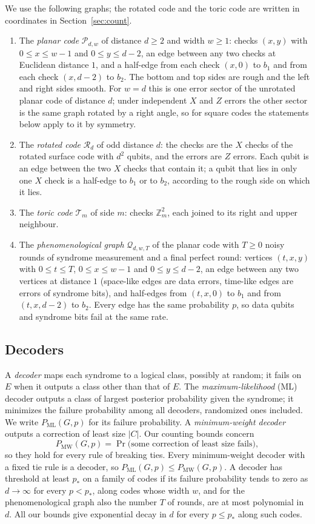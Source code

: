 \documentclass[11pt]{amsart}
\theoremstyle{definition}
\theoremstyle{remark}
\numberwithin{equation}{section}
\newcommand{\PML}{P_{\mathrm{ML}}}
\newcommand{\PMW}{P_{\mathrm{MW}}}
\begin{document}
We use the following graphs; the rotated code and the toric code are written in coordinates in Section~\ref{sec:count}.
\begin{enumerate}[label=(\alph*),leftmargin=2em]
\item The \emph{planar code} $\mathcal P_{d,w}$ of distance $d\ge2$ and width $w\ge1$: checks $(x,y)$ with $0\le x\le w-1$ and $0\le y\le d-2$, an edge between any two checks at Euclidean distance $1$, and a half-edge from each check $(x,0)$ to $b_1$ and from each check $(x,d-2)$ to $b_2$. The bottom and top sides are rough and the left and right sides smooth. For $w=d$ this is one error sector of the unrotated planar code of distance $d$; under independent $X$ and $Z$ errors the other sector is the same graph rotated by a right angle, so for square codes the statements below apply to it by symmetry.
\item The \emph{rotated code} $\mathcal R_d$ of odd distance $d$: the checks are the $X$ checks of the rotated surface code with $d^2$ qubits, and the errors are $Z$ errors. Each qubit is an edge between the two $X$ checks that contain it; a qubit that lies in only one $X$ check is a half-edge to $b_1$ or to $b_2$, according to the rough side on which it lies.
\item The \emph{toric code} $\mathcal T_m$ of side $m$: checks $\mathbb Z_m^2$, each joined to its right and upper neighbour.
\item The \emph{phenomenological graph} $\mathcal Q_{d,w,T}$ of the planar code with $T\ge0$ noisy rounds of syndrome measurement and a final perfect round: vertices $(t,x,y)$ with $0\le t\le T$, $0\le x\le w-1$ and $0\le y\le d-2$, an edge between any two vertices at distance $1$ (space-like edges are data errors, time-like edges are errors of syndrome bits), and half-edges from $(t,x,0)$ to $b_1$ and from $(t,x,d-2)$ to $b_2$. Every edge has the same probability $p$, so data qubits and syndrome bits fail at the same rate.
\end{enumerate}

\subsection{Decoders}\label{sec:decoders}
A \emph{decoder} maps each syndrome to a logical class, possibly at random; it fails on $E$ when it outputs a class other than that of $E$. The \emph{maximum-likelihood} (ML) decoder outputs a class of largest posterior probability given the syndrome; it minimizes the failure probability among all decoders, randomized ones included. We write $\PML(G,p)$ for its failure probability. A \emph{minimum-weight decoder} outputs a correction of least size $|C|$. Our counting bounds concern
\[
\PMW(G,p)=\Pr\bigl(\text{some correction of least size fails}\bigr),
\]
so they hold for every rule of breaking ties. Every minimum-weight decoder with a fixed tie rule is a decoder, so $\PML(G,p)\le\PMW(G,p)$. A decoder has threshold at least $p_\ast$ on a family of codes if its failure probability tends to zero as $d\to\infty$ for every $p<p_\ast$, along codes whose width $w$, and for the phenomenological graph also the number $T$ of rounds, are at most polynomial in $d$. All our bounds give exponential decay in $d$ for every $p\le p_\ast$ along such codes.
\end{document}

